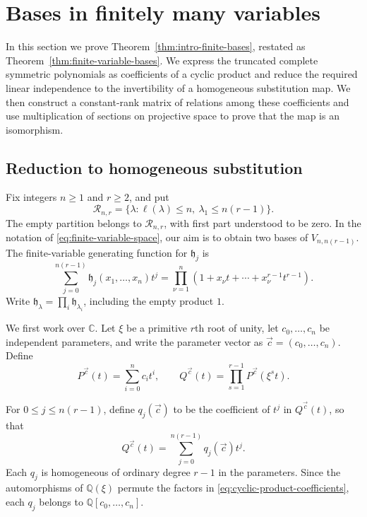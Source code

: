 \documentclass[12pt,reqno,a4paper]{amsart}
\numberwithin{equation}{section}
\numberwithin{figure}{section}
\theoremstyle{plain}
\theoremstyle{definition}
\begin{document}
\section{Bases in finitely many variables}
\label{sec:finite-variable-bases}

In this section we prove Theorem~\ref{thm:intro-finite-bases},
restated as Theorem~\ref{thm:finite-variable-bases}.
We express the truncated complete symmetric polynomials as
coefficients of a cyclic product and reduce the required linear
independence to the invertibility of a homogeneous substitution map.
We then construct a constant-rank matrix of relations among these
coefficients and use multiplication of sections on projective space
to prove that the map is an isomorphism.

\subsection{Reduction to homogeneous substitution}
\label{subsec:finite-homogeneous-substitution}

Fix integers $n\geq1$ and $r\geq2$, and put
\[
 \mathcal R_{n,r}
 =\{\lambda:\ell(\lambda)\leq n,\ \lambda_1\leq n(r-1)\}.
\]
The empty partition belongs to $\mathcal R_{n,r}$, with first part
understood to be zero.  In the notation of
\eqref{eq:finite-variable-space}, our aim is to obtain two bases of
$V_{n,n(r-1)}$.  The finite-variable generating function for $\mathfrak{h}_j$ is
\begin{equation}\label{eq:finite-truncated-generating}
 \sum_{j=0}^{n(r-1)}\mathfrak h_j(x_1,\ldots,x_n)t^j
 =\prod_{\nu=1}^n
       (1+x_\nu t+\cdots+x_\nu^{r-1}t^{r-1}).
\end{equation}
Write $\mathfrak h_\lambda=\prod_i\mathfrak h_{\lambda_i}$,
including the empty product $1$.

We first work over $\mathbb C$.  Let $\xi$ be a primitive $r$th
root of unity, let $c_0,\ldots,c_n$ be independent parameters,
and write the parameter vector as $\vec c=(c_0,\ldots,c_n)$.
Define
\begin{equation}\label{eq:cyclic-product-coefficients}
 P^{\vec c}(t)=\sum_{i=0}^n c_it^i,\qquad
 Q^{\vec c}(t)=\prod_{s=1}^{r-1}P^{\vec c}(\xi^st).
\end{equation}

For $0\leq j\leq n(r-1)$, define $q_j(\vec c)$ to be the coefficient of
$t^j$ in $Q^{\vec c}(t)$, so that
\[
 Q^{\vec c}(t)=\sum_{j=0}^{n(r-1)}q_j(\vec c)t^j.
\]
Each $q_j$ is homogeneous of ordinary degree $r-1$ in the parameters.
Since the automorphisms of $\mathbb Q(\xi)$ permute the factors in
\eqref{eq:cyclic-product-coefficients}, each $q_j$ belongs to
$\mathbb Q[c_0,\ldots,c_n]$.
\end{document}
